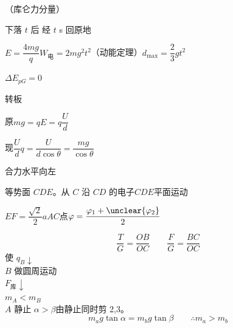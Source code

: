 （库仑力分量）
\begin{problem}
下落 $t$ 后 经 $t$ s 回原地
\begin{solution}
$E=\dfrac{4mg}{q}$\qquad $W_{\text{电}}=2mg^2t^2$（动能定理）\qquad $d_{\max}=\dfrac23gt^2$

$\Delta E_{pG}=0$
\end{solution}
\end{problem}
\begin{problem}[4]
转板
\begin{solution}
原\quad $mg=qE=q\dfrac{U}{d}$

现\quad $\dfrac{U}{d}q=\dfrac{U}{d\cos\theta}=\dfrac{mg}{\cos\theta}$ %

合力水平向左
\end{solution}
\end{problem}
\begin{problem}
等势面 $CDE$。从 $C$ 沿 $CD$ 的电子$CDE$平面运动 %

$EF=\dfrac{\sqrt2}{2}a$\qquad $AC$点\quad $\varphi=\dfrac{\varphi_1+\unclear{\varphi_2}}{2}$ %
\end{problem}
\[
\frac{T}{G}=\frac{OB}{OC}\qquad \frac{F}{G}=\frac{BC}{OC}
\]
使 $q_B\downarrow$ \\
$B$ 做圆周运动 \\
$F_{\text{库}}\downarrow$ \\
$m_A<m_B$ \\
$A$ 静止
$\alpha>\beta$\quad 由静止同时剪 2,3。
\[
m_ag\tan\alpha=m_bg\tan\beta \qquad \therefore m_a>m_b %
\]
